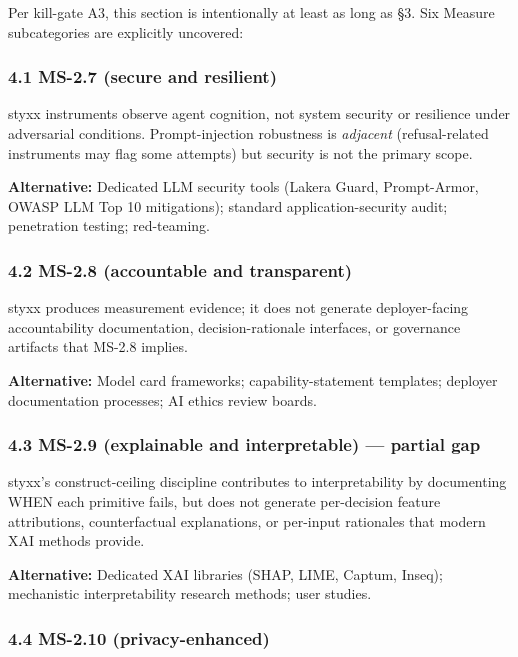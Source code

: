 \documentclass[
]{article}
\begin{document}
Per kill-gate A3, this section is intentionally at least as long as §3.
Six Measure subcategories are explicitly uncovered:

\subsubsection{4.1 MS-2.7 (secure and
resilient)}\label{ms-2.7-secure-and-resilient}

styxx instruments observe agent cognition, not system security or
resilience under adversarial conditions. Prompt-injection robustness is
\emph{adjacent} (refusal-related instruments may flag some attempts) but
security is not the primary scope.

\textbf{Alternative:} Dedicated LLM security tools (Lakera Guard,
Prompt-Armor, OWASP LLM Top 10 mitigations); standard
application-security audit; penetration testing; red-teaming.

\subsubsection{4.2 MS-2.8 (accountable and
transparent)}\label{ms-2.8-accountable-and-transparent}

styxx produces measurement evidence; it does not generate
deployer-facing accountability documentation, decision-rationale
interfaces, or governance artifacts that MS-2.8 implies.

\textbf{Alternative:} Model card frameworks; capability-statement
templates; deployer documentation processes; AI ethics review boards.

\subsubsection{4.3 MS-2.9 (explainable and interpretable) --- partial
gap}\label{ms-2.9-explainable-and-interpretable-partial-gap}

styxx's construct-ceiling discipline contributes to interpretability by
documenting WHEN each primitive fails, but does not generate
per-decision feature attributions, counterfactual explanations, or
per-input rationales that modern XAI methods provide.

\textbf{Alternative:} Dedicated XAI libraries (SHAP, LIME, Captum,
Inseq); mechanistic interpretability research methods; user studies.

\subsubsection{4.4 MS-2.10
(privacy-enhanced)}\label{ms-2.10-privacy-enhanced}
\end{document}
